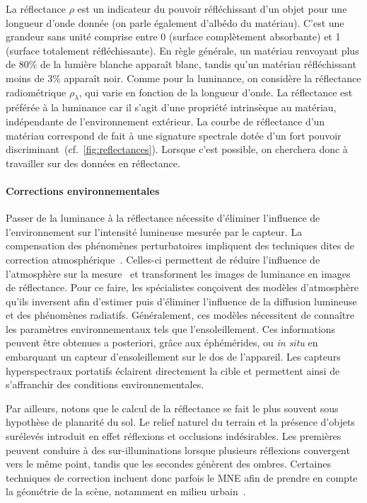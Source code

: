 La réflectance $\rho$ est un indicateur du pouvoir réfléchissant d'un objet pour une longueur d'onde donnée (on parle également d'albédo du matériau). C'est une grandeur sans unité comprise entre 0 (surface complètement absorbante) et 1 (surface totalement réfléchissante). En règle générale, un matériau renvoyant plus de 80\% de la lumière blanche apparaît blanc, tandis qu'un matériau réfléchissant moins de 3\% apparaît noir. Comme pour la luminance, on considère la réflectance radiométrique $\rho_\lambda$, qui varie en fonction de la longueur d'onde. La réflectance est préférée à la luminance car il s'agit d'une propriété intrinsèque au matériau, indépendante de l'environnement extérieur. La courbe de réflectance d'un matériau correspond de fait à une signature spectrale dotée d'un fort pouvoir discriminant~(cf.~\cref{fig:reflectances}). Lorsque c'est possible, on cherchera donc à travailler sur des données en réflectance.

\paragraph{Corrections environnementales}
Passer de la luminance à la réflectance nécessite d'éliminer l'influence de l'environnement sur l'intensité lumineuse mesurée par le capteur. La compensation des phénomènes perturbatoires impliquent des techniques dites de correction atmosphérique~\cite{deschamps_atmospheric_1980, rahman_smac_1994, chavez_image-based_1996}. Celles-ci permettent de réduire l'influence de l'atmosphère sur la mesure~\cite{gao_atmospheric_2009} et transforment les images de luminance en images de réflectance. Pour ce faire, les spécialistes conçoivent des modèles d'atmosphère qu'ils inversent afin d'estimer puis d'éliminer l'influence de la diffusion lumineuse et des phénomènes radiatifs. Généralement, ces modèles nécessitent de connaître les paramètres environnementaux tels que l'ensoleillement. Ces informations peuvent être obtenues a posteriori, grâce aux éphémérides, ou \emph{in situ} en embarquant un capteur d'ensoleillement sur le dos de l'appareil. Les capteurs hyperspectraux portatifs éclairent directement la cible et permettent ainsi de s'affranchir des conditions environnementales.

Par ailleurs, notons que le calcul de la réflectance se fait le plus souvent sous hypothèse de planarité du sol. Le relief naturel du terrain et la présence d'objets surélevés introduit en effet réflexions et occlusions indésirables. Les premières peuvent conduire à des sur-illuminations lorsque plusieurs réflexions convergent vers le même point, tandis que les secondes génèrent des ombres. Certaines techniques de correction incluent donc parfois le \gls{MNE} afin de prendre en compte la géométrie de la scène, notamment en milieu urbain~\cite{ceamanos_using_2017}.

